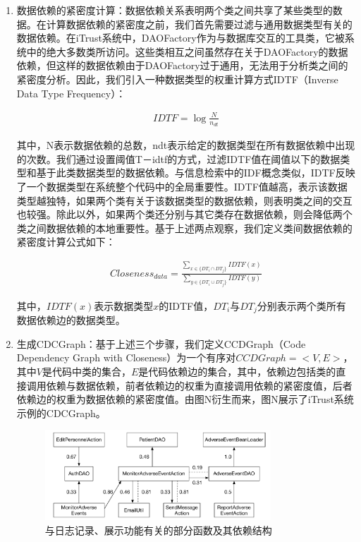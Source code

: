 \begin{enumerate}
  \item 数据依赖的紧密度计算：数据依赖关系表明两个类之间共享了某些类型的数据。在计算数据依赖的紧密度之前，我们首先需要过滤与通用数据类型有关的数据依赖。在iTrust系统中，DAOFactory作为与数据库交互的工具类，它被系统中的绝大多数类所访问。这些类相互之间虽然存在关于DAOFactory的数据依赖，但这样的数据依赖由于DAOFactory过于通用，无法用于分析类之间的紧密度分析。因此，我们引入一种数据类型的权重计算方式IDTF（Inverse Data Type Frequency）\cite{kuang2015can}：

  \begin{align}IDTF=\log\frac {N} {n_{dt}}\end{align}

  其中，N表示数据依赖的总数，ndt表示给定的数据类型在所有数据依赖中出现的次数。我们通过设置阈值T－idtf的方式，过滤IDTF值在阈值以下的数据类型和基于此类数据类型的数据依赖。与信息检索中的IDF概念类似，IDTF反映了一个数据类型在系统整个代码中的全局重要性。IDTF值越高，表示该数据类型越独特，如果两个类有关于该数据类型的数据依赖，则表明类之间的交互也较强。除此以外，如果两个类还分别与其它类存在数据依赖，则会降低两个类之间数据依赖的本地重要性。基于上述两点观察，我们定义类间数据依赖的紧密度计算公式如下：

  \begin{align}Closeness_{data}=\frac {\sum _{x \in \{DT_{i}\cap DT_{j}\}}IDTF(x)} {\sum _{y \in \{DT_{i}\cup DT_{j}\}}IDTF(y)}\end{align}

  其中，$IDTF(x)$表示数据类型$x$的IDTF值，$DT_{i}$与$DT_{j}$分别表示两个类所有数据依赖边的数据类型。

  \item 生成CDCGraph：基于上述三个步骤，我们定义CCDGraph（Code Dependency Graph with Closeness）为一个有序对$CCDGraph = <V, E>$，其中$V$是代码中类的集合，$E$是代码依赖边的集合，其中，依赖边包括类的直接调用依赖与数据依赖，前者依赖边的权重为直接调用依赖的紧密度值，后者依赖边的权重为数据依赖的紧密度值。由图N衍生而来，图N展示了iTrust系统示例的CDCGraph。

  \begin{figure}[thb]
    \centering
    \includegraphics[width=0.8\textwidth]{./figures/traceability_sample/sample_closeness.pdf}
    \caption{与日志记录、展示功能有关的部分函数及其依赖结构}
    \label{F:sample_closeness}
  \end{figure}
\end{enumerate}

